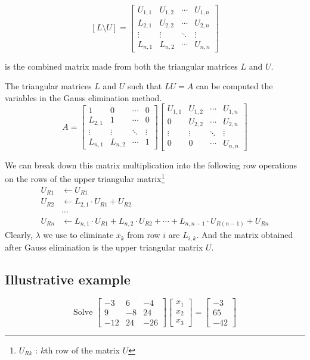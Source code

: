 	\[ [L\text{\textbackslash{}}U] = \begin{bmatrix} U_{1,1} & U_{1,2} & \cdots & U_{1,n} \\ L_{2,1} & U_{2,2} & \cdots & U_{2,n} \\ \vdots & \vdots & \ddots & \vdots \\  L_{n,1} & L_{n,2} & \cdots & U_{n,n} \end{bmatrix} \]

	is the combined matrix made from both the triangular matrices $L$ and $U$.

	The triangular matrices $L$ and $U$ such that $LU = A$ can be computed the variables in the Gauss elimination method.
	\[ A = \begin{bmatrix} 1 & 0 & \cdots & 0 \\ L_{2,1} & 1 & \cdots & 0 \\ \vdots & \vdots & \ddots & \vdots \\ L_{n,1} & L_{n,2} & \cdots & 1 \end{bmatrix} \begin{bmatrix} U_{1,1} & U_{1,2} & \cdots & U_{1,n} \\ 0 & U_{2,2} & \cdots & U_{2,n} \\ \vdots & \vdots & \ddots & \vdots \\ 0 & 0 & \cdots & U_{n,n} \end{bmatrix} \]
	\begin{commentary}
		We can break down this matrix multiplication into the following row operations on the rows of the upper triangular matrix\footnote{$U_{Rk}$ : $k$th row of the matrix $U$}
	\begin{align*}
		U_{R1} & \leftarrow U_{R1} \\
		U_{R2} & \leftarrow L_{2,1}\cdot{}U_{R1} + U_{R2} \\
		& \cdots \\
		U_{Rn} & \leftarrow L_{n,1}\cdot{}U_{R1} + L_{n,2}\cdot{}U_{R2} + \cdots + L_{n,n-1}\cdot{}U_{R(n-1)} + U_{Rn}
	\end{align*}
	Clearly, $\lambda$ we use to eliminate $x_k$ from row $i$ are $L_{i,k}$.
		And the matrix obtained after Gauss elimination is the upper triangular matrix $U$.
	\end{commentary}
\subsection{Illustrative example}
	\[ \text{Solve } \begin{bmatrix} -3 & 6 & -4 \\ 9 & -8 & 24 \\ -12 & 24 & -26 \end{bmatrix} \begin{bmatrix} x_1 \\ x_2 \\ x_3 \end{bmatrix} = \begin{bmatrix} -3 \\ 65 \\ -42 \end{bmatrix} \]
